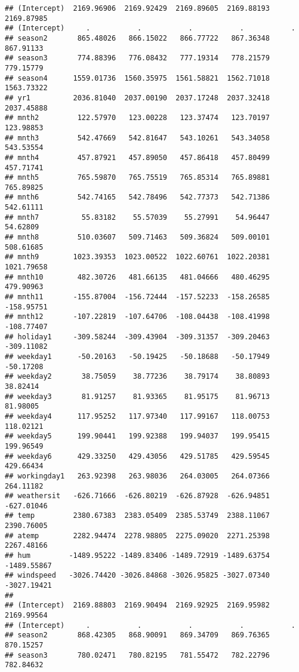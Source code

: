\documentclass[]{article}
\begin{document}
\begin{verbatim}
## (Intercept)  2169.96906  2169.92429  2169.89605  2169.88193  2169.87985
## (Intercept)     .           .           .           .           .      
## season2       865.48026   866.15022   866.77722   867.36348   867.91133
## season3       774.88396   776.08432   777.19314   778.21579   779.15779
## season4      1559.01736  1560.35975  1561.58821  1562.71018  1563.73322
## yr1          2036.81040  2037.00190  2037.17248  2037.32418  2037.45888
## mnth2         122.57970   123.00228   123.37474   123.70197   123.98853
## mnth3         542.47669   542.81647   543.10261   543.34058   543.53554
## mnth4         457.87921   457.89050   457.86418   457.80499   457.71741
## mnth5         765.59870   765.75519   765.85314   765.89881   765.89825
## mnth6         542.74165   542.78496   542.77373   542.71386   542.61111
## mnth7          55.83182    55.57039    55.27991    54.96447    54.62809
## mnth8         510.03607   509.71463   509.36824   509.00101   508.61685
## mnth9        1023.39353  1023.00522  1022.60761  1022.20381  1021.79658
## mnth10        482.30726   481.66135   481.04666   480.46295   479.90963
## mnth11       -155.87004  -156.72444  -157.52233  -158.26585  -158.95751
## mnth12       -107.22819  -107.64706  -108.04438  -108.41998  -108.77407
## holiday1     -309.58244  -309.43904  -309.31357  -309.20463  -309.11082
## weekday1      -50.20163   -50.19425   -50.18688   -50.17949   -50.17208
## weekday2       38.75059    38.77236    38.79174    38.80893    38.82414
## weekday3       81.91257    81.93365    81.95175    81.96713    81.98005
## weekday4      117.95252   117.97340   117.99167   118.00753   118.02121
## weekday5      199.90441   199.92388   199.94037   199.95415   199.96549
## weekday6      429.33250   429.43056   429.51785   429.59545   429.66434
## workingday1   263.92398   263.98036   264.03005   264.07366   264.11182
## weathersit   -626.71666  -626.80219  -626.87928  -626.94851  -627.01046
## temp         2380.67383  2383.05409  2385.53749  2388.11067  2390.76005
## atemp        2282.94474  2278.98805  2275.09020  2271.25398  2267.48166
## hum         -1489.95222 -1489.83406 -1489.72919 -1489.63754 -1489.55867
## windspeed   -3026.74420 -3026.84868 -3026.95825 -3027.07340 -3027.19421
##                                                                        
## (Intercept)  2169.88803  2169.90494  2169.92925  2169.95982  2169.99564
## (Intercept)     .           .           .           .           .      
## season2       868.42305   868.90091   869.34709   869.76365   870.15257
## season3       780.02471   780.82195   781.55472   782.22796   782.84632

\end{verbatim}
\end{document}
